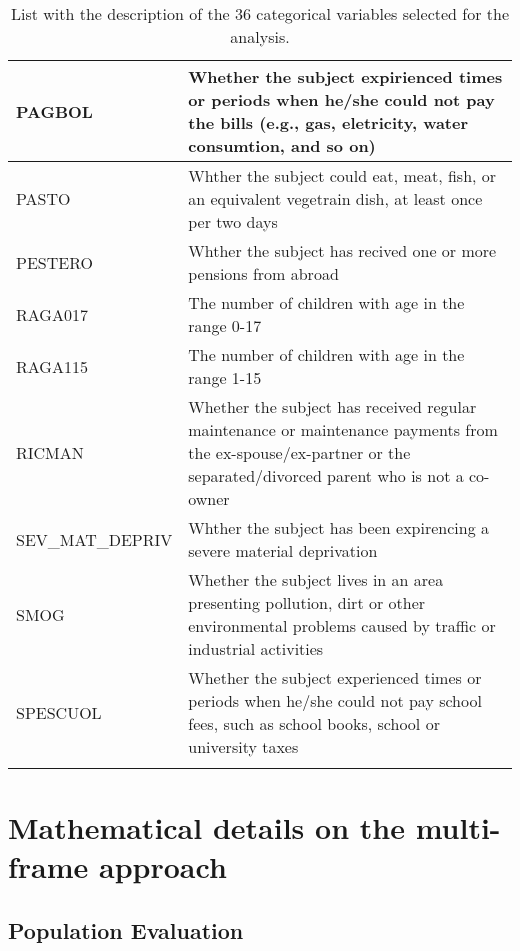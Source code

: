 \begin{appendices}
\begin{longtable}{ | m{4cm} | m{12cm}|}
    \hline
    PAGBOL &                 Whether the subject expirienced times or periods when he/she could not pay the bills (e.g., gas, eletricity, water consumtion, and so on) \\
    \hline
    PASTO &                 Whther the subject could eat, meat, fish, or an equivalent vegetrain dish, at least once per two days \\
    \hline
    PESTERO &                 Whther the subject has recived one or more pensions from abroad  \\
    \hline
    RAGA017 &                 The number of children with age in the range 0-17 \\
    \hline
    RAGA115 &                 The number of children with age in the range 1-15 \\
    \hline
    RICMAN &                 Whether the subject has received regular maintenance or maintenance payments from the ex-spouse/ex-partner or the separated/divorced parent who is not a co-owner \\
    \hline
    SEV\_MAT\_DEPRIV &                 Whther the subject has been expirencing a severe material deprivation \\
    \hline
    SMOG &                 Whether the subject lives in an area presenting pollution, dirt or other environmental problems caused by traffic or industrial activities \\
    \hline
    SPESCUOL &               Whether the subject experienced times or periods when he/she could not  pay school fees, such as school books, school or university taxes \\
    \hline
    \caption{List with the description of the 36 categorical variables selected for the analysis.}
    \label{tab: descitpion eu-silc_data}
\end{longtable}

\section{Mathematical details on the multi-frame approach}\label{apx: dettagli_matematici}

\subsection{Population Evaluation}\label{apx: population_evaluation}


\end{appendices}
